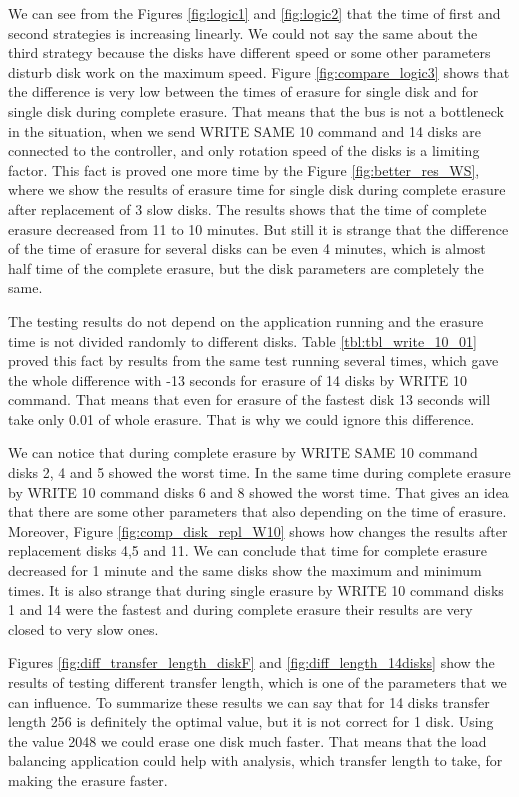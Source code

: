 We can see from the Figures \ref{fig:logic1} and \ref{fig:logic2} that the time of first and second strategies is increasing linearly. We could not say the same about the third strategy because the disks have different speed or some other parameters disturb disk work on the maximum speed. Figure \ref{fig:compare_logic3} shows that the difference is very low between the times of erasure for single disk and for single disk during complete erasure. That means that the bus is not a bottleneck in the situation, when we send WRITE SAME 10 command and 14 disks are connected to the controller, and only rotation speed of the disks is a limiting factor. This fact is proved one more time by the Figure \ref{fig:better_res_WS}, where we show the results of erasure time for single disk during complete erasure after replacement of 3 slow disks. The results shows that the time of complete erasure decreased from 11 to 10 minutes. But still it is strange that the difference of the time of erasure for several disks can be even 4 minutes, which is almost half time of the complete erasure, but the disk parameters are completely the same.

The testing results do not depend on the application running and the erasure time is not divided randomly to different disks. Table \ref{tbl:tbl_write_10_01} proved this fact by results from the same test running several times, which gave the whole difference with -13 seconds for erasure of 14 disks by WRITE 10 command. That means that even for erasure of the fastest disk 13 seconds will take only 0.01 of whole erasure. That is why we could ignore this difference. 

We can notice that during complete erasure by WRITE SAME 10 command disks 2, 4 and 5 showed the worst time. In the same time during complete erasure by WRITE 10 command disks 6 and 8 showed the worst time. That gives an idea that there are some other parameters that also depending on the time of erasure. Moreover, Figure \ref{fig:comp_disk_repl_W10} shows how changes the results after replacement disks 4,5 and 11. We can conclude that time for complete erasure decreased for 1 minute and the same disks show the maximum and minimum times. It is also strange that during single erasure by WRITE 10 command disks 1 and 14 were the fastest and during complete erasure their results are very closed to very slow ones.

Figures \ref{fig:diff_transfer_length_diskF} and \ref{fig:diff_length_14disks} show the results of testing different transfer length, which is one of the parameters that we can influence. To summarize these results we can say that for 14 disks transfer length 256 is definitely the optimal value, but it is not correct for 1 disk. Using the value 2048 we could erase one disk much faster. That means that the load balancing application could help with analysis, which transfer length to take, for making the erasure faster.